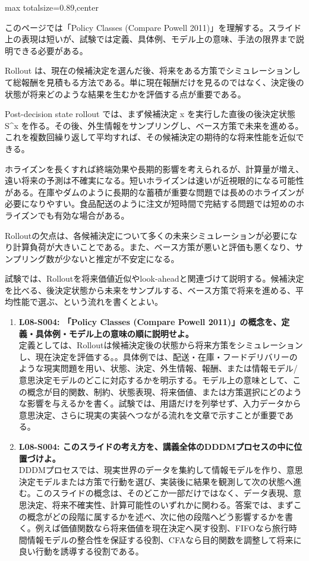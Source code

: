 \begin{minipage}[t]{0.58\textwidth}
\begin{adjustbox}{max totalsize={\textwidth}{0.89\textheight},center}
\begin{minipage}{\textwidth}\scriptsize
{}このページでは「Policy Classes (Compare Powell 2011)」を理解する。スライド上の表現は短いが、試験では定義、具体例、モデル上の意味、手法の限界まで説明できる必要がある。\par
Rollout は、現在の候補決定を選んだ後、将来をある方策でシミュレーションして総報酬を見積もる方法である。単に現在報酬だけを見るのではなく、決定後の状態が将来どのような結果を生むかを評価する点が重要である。\par
Post-decision state rollout では、まず候補決定 x を実行した直後の後決定状態 S\textasciicircum{}x を作る。その後、外生情報をサンプリングし、ベース方策で未来を進める。これを複数回繰り返して平均すれば、その候補決定の期待的な将来性能を近似できる。\par
ホライズンを長くすれば終端効果や長期的影響を考えられるが、計算量が増え、遠い将来の予測は不確実になる。短いホライズンは速いが近視眼的になる可能性がある。在庫やダムのように長期的な蓄積が重要な問題では長めのホライズンが必要になりやすい。食品配送のように注文が短時間で完結する問題では短めのホライズンでも有効な場合がある。\par
Rolloutの欠点は、各候補決定について多くの未来シミュレーションが必要になり計算負荷が大きいことである。また、ベース方策が悪いと評価も悪くなり、サンプリング数が少ないと推定が不安定になる。\par
試験では、Rolloutを将来価値近似やlook-aheadと関連づけて説明する。候補決定を比べる、後決定状態から未来をサンプルする、ベース方策で将来を進める、平均性能で選ぶ、という流れを書くとよい。\par{}\begin{enumerate}\item \textbf{L08-S004: 「Policy Classes (Compare Powell 2011)」の概念を、定義・具体例・モデル上の意味の順に説明せよ。}\\定義としては、Rolloutは候補決定後の状態から将来方策をシミュレーションし、現在決定を評価する。。具体例では、配送・在庫・フードデリバリーのような現実問題を用い、状態、決定、外生情報、報酬、または情報モデル/意思決定モデルのどこに対応するかを明示する。モデル上の意味として、この概念が目的関数、制約、状態表現、将来価値、または方策選択にどのような影響を与えるかを書く。試験では、用語だけを列挙せず、入力データから意思決定、さらに現実の実装へつながる流れを文章で示すことが重要である。\item \textbf{L08-S004: このスライドの考え方を、講義全体のDDDMプロセスの中に位置づけよ。}\\DDDMプロセスでは、現実世界のデータを集約して情報モデルを作り、意思決定モデルまたは方策で行動を選び、実装後に結果を観測して次の状態へ進む。このスライドの概念は、そのどこか一部だけではなく、データ表現、意思決定、将来不確実性、計算可能性のいずれかに関わる。答案では、まずこの概念がどの段階に属するかを述べ、次に他の段階へどう影響するかを書く。例えば価値関数なら将来価値を現在決定へ戻す役割、FIFOなら旅行時間情報モデルの整合性を保証する役割、CFAなら目的関数を調整して将来に良い行動を誘導する役割である。\end{enumerate}

\end{minipage}
\end{adjustbox}
\end{minipage}
